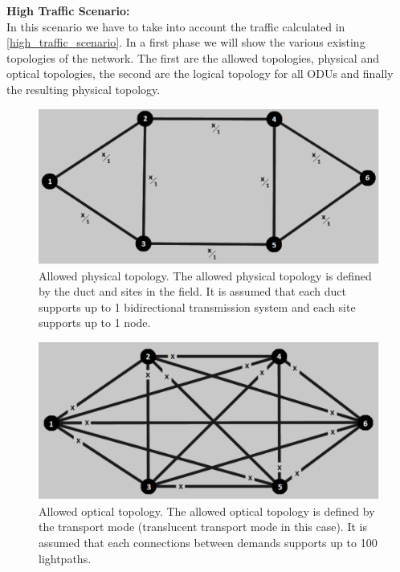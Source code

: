 \noindent
\textbf{High Traffic Scenario:}\\

In this scenario we have to take into account the traffic calculated in \ref{high_traffic_scenario}. In a first phase we will show the various existing topologies of the network. The first are the allowed topologies, physical and optical topologies, the second are the logical topology for all ODUs and finally the resulting physical topology.\\

\begin{figure}[H]
\centering
\includegraphics[width=13cm]{sdf/heuristic/translucent_survivability/figures/allowed_physical}
\caption{Allowed physical topology. The allowed physical topology is defined by the duct and sites in the field. It is assumed that each duct supports up to 1 bidirectional transmission system and each site supports up to 1 node.}
\label{allowed_physical_surv_ref_high_heuristic_translucent}
\end{figure}

\begin{figure}[H]
\centering
\includegraphics[width=13cm]{sdf/heuristic/translucent_survivability/figures/allowed_optical}
\caption{Allowed optical topology. The allowed optical topology is defined by the transport mode (translucent transport mode in this case). It is assumed that each connections between demands supports up to 100 lightpaths.}
\label{allowed_optical_surv_ref_high_heuristic_translucent}
\end{figure}

